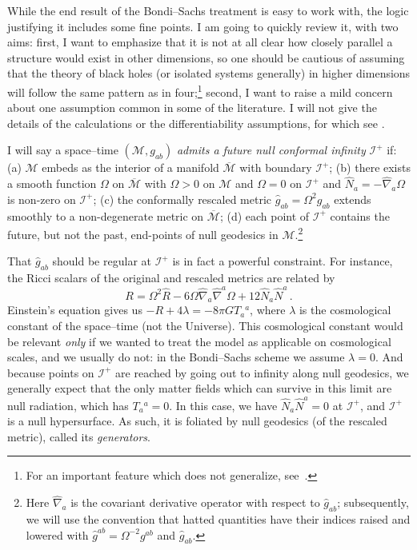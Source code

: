 \documentclass[12pt]{article}
\newcommand{\scrif}{{{\mathscr I}^{+}}}
\newcommand{\MM}{{\mathscr M}}
\begin{document}
While the end result of the Bondi--Sachs treatment is easy to work with, the logic justifying it includes some fine points.  I am going to quickly review it, with two aims:  first, I want to emphasize that it is not at all clear how closely parallel a structure would exist  in other dimensions, so one should be cautious of assuming that the theory of black holes (or isolated systems generally) in higher dimensions will follow the same pattern as in four;\footnote{For an important feature which does not generalize, see~\citet{Hollands:2004ac}.} second, I want to raise a mild concern about one assumption common in some of the literature.  I will not give the details of the calculations or the differentiability assumptions, for which see \citet{Penrose:1986ca}.

I will say a space--time $(\MM ,g_{ab})$ {\em admits a future null conformal infinity} $\scrif$ if: (a) $\MM$ embeds as the interior of a manifold $\overline\MM$ with boundary $\scrif$; (b) there exists a smooth function $\Omega$ on $\overline\MM$ with $\Omega >0$ on $\MM$ and $\Omega =0$ on $\scrif$
and ${\hat N}_a=-{\hat\nabla}_a\Omega$ is non-zero on $\scrif$; (c) the conformally rescaled metric ${\hat g}_{ab}=\Omega ^2g_{ab}$ extends smoothly to a non-degenerate metric on $\overline\MM$; (d) each point of $\scrif$ contains the future, but not the past, end-points of null geodesics in $\MM$.\footnote{Here $ {\hat\nabla}_a $ is the covariant derivative operator with respect to ${\hat g}_{ab}$; subsequently, we will use the convention that hatted quantities have their indices raised and lowered with ${\hat g}^{ab}=\Omega ^{-2}g^{ab}$ and ${\hat g}_{ab}$.}

That ${\hat g}_{ab}$ should be regular at $\scrif$ is in fact a powerful constraint.  For instance, the Ricci scalars of the 
original and rescaled metrics are related by
\begin{equation}\label{Rsc}
R=\Omega ^2{\hat R} -6\Omega{\hat\nabla}_a{\hat\nabla}^a\Omega +12{\hat N}_a{\hat N}^a\, .
\end{equation}
Einstein's equation gives us $-R+4\lambda =-8\pi G T_a{}^a$, where $\lambda$ is the cosmological constant of the space--time (not the Universe).  This
cosmological constant would be relevant {\em only} if we wanted to treat the model as applicable on cosmological scales, and we usually do not: in the Bondi--Sachs scheme we assume $\lambda =0$.  And
because points on $\scrif$ are reached by going out to infinity along null geodesics, we generally expect that the only matter fields which can survive in this limit are null radiation, which has $T_a{}^a=0$.  In this case,
we have 
${\hat N}_a{\hat N}^a=0$ at $\scrif$, and
$\scrif$ is 
a null hypersurface.
As such, it is foliated by null geodesics (of the rescaled metric), called its {\em generators}.
\end{document}

